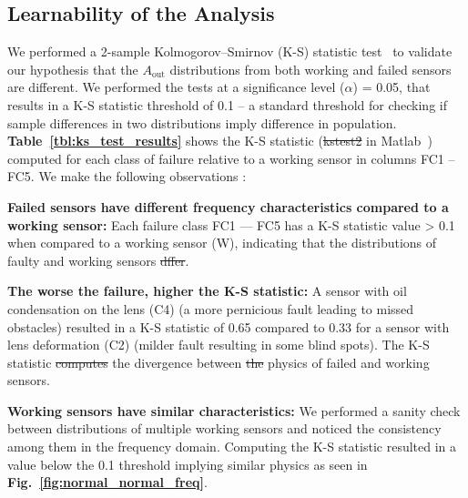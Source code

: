 \documentclass[manuscript,screen,review]{acmart} %
\newcommand{\aout}{$A_{\text{out}}$\xspace}
\providecommand{\DIFadd}[1]{{\protect\color{blue}\uwave{#1}}} %
\providecommand{\DIFdel}[1]{{\protect\color{red}\sout{#1}}}                      %
\providecommand{\DIFaddbegin}{} %
\providecommand{\DIFaddend}{} %
\providecommand{\DIFdelbegin}{} %
\providecommand{\DIFdelend}{} %
\newcommand{\DIFscaledelfig}{0.5}
\newlength{\DIFdelgraphicswidth} %
\newlength{\DIFdelgraphicsheight} %
\newcommand{\DIFaddincludegraphics}[2][]{{\color{blue}\fbox{\DIFOincludegraphics[#1]{#2}}}} %
\newcommand{\DIFdelincludegraphics}[2][]{%
\sbox{\DIFdelgraphicsbox}{\DIFOincludegraphics[#1]{#2}}%
\settoboxwidth{\DIFdelgraphicswidth}{\DIFdelgraphicsbox} %
\settoboxtotalheight{\DIFdelgraphicsheight}{\DIFdelgraphicsbox} %
\scalebox{\DIFscaledelfig}{%
\parbox[b]{\DIFdelgraphicswidth}{\usebox{\DIFdelgraphicsbox}\\[-\baselineskip] \rule{\DIFdelgraphicswidth}{0em}}\llap{\resizebox{\DIFdelgraphicswidth}{\DIFdelgraphicsheight}{%
\setlength{\unitlength}{\DIFdelgraphicswidth}%
\begin{picture}(1,1)%
\thicklines\linethickness{2pt} %
{\color[rgb]{1,0,0}\put(0,0){\framebox(1,1){}}}%
{\color[rgb]{1,0,0}\put(0,0){\line( 1,1){1}}}%
{\color[rgb]{1,0,0}\put(0,1){\line(1,-1){1}}}%
\end{picture}%
}\hspace*{3pt}}} %
} %
\DeclareRobustCommand{\DIFaddbegin}{\DIFOaddbegin \let\includegraphics\DIFaddincludegraphics} %
\DeclareRobustCommand{\DIFaddend}{\DIFOaddend \let\includegraphics\DIFOincludegraphics} %
\DeclareRobustCommand{\DIFdelbegin}{\DIFOdelbegin \let\includegraphics\DIFdelincludegraphics} %
\DeclareRobustCommand{\DIFdelend}{\DIFOaddend \let\includegraphics\DIFOincludegraphics} %
\begin{document}
\DIFaddend \subsection{Learnability of the Analysis}
\label{subsec:learnability}

We performed a 2-sample Kolmogorov–Smirnov (K-S) statistic test~\cite{massey1951kolmogorov} to validate our hypothesis that the \aout distributions from both working and failed sensors are different.  We performed the tests at a significance level ($\alpha$) = 0.05, that results in a K-S statistic threshold of 0.1 -- a standard threshold for checking if sample differences in two distributions imply difference in population. {\bfseries Table~\ref{tbl:ks_test_results}} shows the K-S statistic (\DIFdelbegin \DIFdel{kstest2 }\DIFdelend \DIFaddbegin \texttt{\DIFadd{kstest2}} \DIFaddend in Matlab~\cite{mathworks2015kstest2}) computed for each class of failure relative to a working sensor in columns FC1 -- FC5. We make the following observations :

\noindent \textbf{Failed sensors have different frequency characteristics compared to a working sensor:} Each failure class FC1 --- FC5 has a K-S statistic value > 0.1 when compared to a working sensor (W), indicating that the distributions of faulty and working sensors \DIFdelbegin \DIFdel{dffer}\DIFdelend \DIFaddbegin \DIFadd{differ}\DIFaddend . 

\noindent \textbf{The worse the failure, higher the K-S statistic:} A sensor with oil condensation on the lens (C4) (a more pernicious fault leading to missed obstacles) resulted in a K-S statistic of 0.65 compared to 0.33 for a sensor with lens deformation (C2) (milder fault resulting in some blind spots). The K-S statistic \DIFdelbegin \DIFdel{computes }\DIFdelend \DIFaddbegin \DIFadd{captures }\DIFaddend the divergence between \DIFdelbegin \DIFdel{the }\DIFdelend physics of failed and working sensors.


\noindent \textbf{Working sensors have similar characteristics:} We performed a sanity check between distributions of multiple working sensors and noticed the consistency among them in the frequency domain. Computing the K-S statistic resulted in a value below the 0.1 threshold implying similar physics as seen in {\bfseries Fig.~\ref{fig:normal_normal_freq}}.
\end{document}
